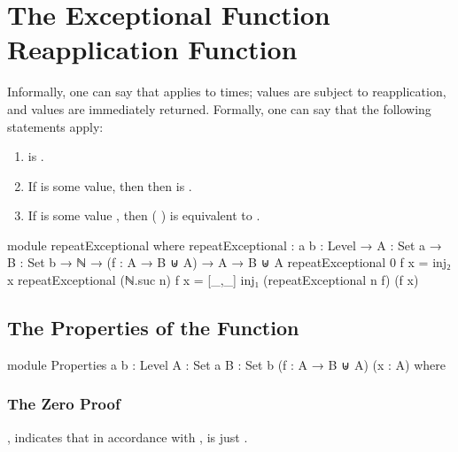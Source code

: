 \documentclass{report}
\begin{document}
\section{The Exceptional Function Reapplication Function}
Informally, one can say that     applies  to   times;  values are subject to reapplication, and  values are immediately returned.  Formally, one can say that the following statements apply:

\begin{enumerate}
  \item {}    is  .\label{enum:repeatExceptional-zeroIsInj2}
  \item If   is some  value, then then     is  .\label{enum:repeatExceptional-inj1GetsReturned}
  \item If   is some value  , then  \AgdaSymbol( \AgdaSymbol)   is equivalent to    .\label{enum:inj2GetsRepeat}
\end{enumerate}

\begin{code}
module repeatExceptional where
  repeatExceptional :
    {a b : Level} →
    {A : Set a} →
    {B : Set b} →
    ℕ → (f : A → B ⊎ A) → A → B ⊎ A
  repeatExceptional 0 f x = inj₂ x
  repeatExceptional (ℕ.suc n) f x =
    [_,_] inj₁ (repeatExceptional n f) (f x)
\end{code}

\subsection{The Properties of the Function}

\begin{code}
  module Properties
    {a b : Level}
    {A : Set a}
    {B : Set b}
    (f : A → B ⊎ A)
    (x : A) where
\end{code}

\subsubsection{The Zero Proof}
, indicates that in accordance with ,     is just  .
\end{document}
